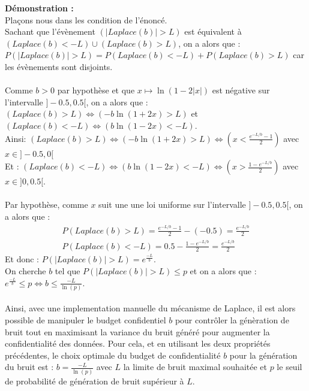\documentclass{article}
\begin{document}
                \textbf{Démonstration :}\\
                Plaçons nous dans les condition de l'énoncé.\\
                Sachant que l'évènement $(|Laplace(b)| > L)$ est équivalent à $(Laplace(b)<-L) \cup (Laplace(b)>L)$, on a alors que :
                \(P( |Laplace(b)| > L) = P(Laplace(b)<-L) + P(Laplace(b)>L) \) car les évènements sont disjoints.\\
                \\
                Comme $b>0$ par hypothèse et que $x\mapsto \ln(1 - 2|x|)$ est négative sur l'intervalle $]-0.5, 0.5[$, on a alors que :
                \( (Laplace(b)>L) \Leftrightarrow (-b \ln(1+2x)>L)\) et \( (Laplace(b)<-L) \Leftrightarrow (b \ln(1-2x)<-L)\). \\
                Ainsi: $ (Laplace(b)>L) \Leftrightarrow ( -b \ln(1+2x)>L) \Leftrightarrow (x < \frac{ e^{-L/b}-1}{2})$ avec $x\in]-0.5,0[$\\
Et : $ (Laplace(b)<-L) \Leftrightarrow ( b \ln(1-2x)<-L) \Leftrightarrow (x > \frac{ 1-e^{-L/b}}{2})$ avec $x\in]0,0.5[$.\\
\\
Par hypothèse, comme $x$ suit une une loi uniforme sur l'intervalle $]-0.5, 0.5[$, on a alors que :
\begin{align*}
    P(Laplace(b)>L) = \frac{ e^{-L/b}-1}{2} - (-0.5) = \frac{ e^{-L/b}}{2} \\
    P(Laplace(b)<-L) = 0.5 - \frac{ 1-e^{-L/b}}{2} = \frac{ e^{-L/b}}{2}
\end{align*}
Et donc : $P( |Laplace(b)| > L) = e^{\frac{-L}{b}}$.\\
On cherche $b$ tel que $P( |Laplace(b)| > L) \leq p$ et on a alors que : $e^{\frac{-L}{b}} \leq p \Leftrightarrow b \leq \frac{-L}{\ln(p)}$.\\
\\
Ainsi, avec une implementation manuelle du mécanisme de Laplace, il est alors possible de manipuler le budget confidentiel $b$ pour contrôler
la génèration de bruit tout en maximisant la variance du bruit généré pour augmenter la confidentialité des données. Pour cela, et en utilisant les deux propriétés précédentes,
le choix optimale du budget de confidentialité $b$ pour la génération du bruit est : $b = \frac{-L}{\ln(p)}$ avec $L$ la limite de bruit maximal souhaitée et $p$ le seuil de probabilité de génération de bruit supérieur à $L$.\\
\end{document}
